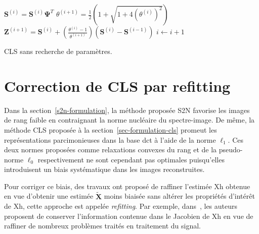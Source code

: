 \begin{normalalgorithme*}[t]
\begin{minipage}{\textwidth}
\begin{algorithm}[H]
{                    
                    $\mathbf{S}^{(i)} = \mathbf{S}^{(i)}\boldsymbol\Psi^T$  \hfill{}
                    $\theta^{(i+1)} = \frac{1}{2} \left(1+\sqrt{1+4(\theta^{(i)})^2}\right)$\;
                    $\mathbf{Z}^{(i+1)} = \mathbf{S}^{(i)} + \left( \frac{\theta^{(i)}-1}{\theta^{(i+1)}} \right) \left(\mathbf{S}^{(i)}-\mathbf{S}^{(i-1)} \right)$\;
                    $i \leftarrow i+1$
                }
                \medskip
            \end{algorithm}
        \end{minipage}
        \caption{CLS sans recherche de paramètres.\protect\label{algo-cls-sans-param}}
    \end{normalalgorithme*}




\section{Correction de CLS par refitting}

Dans la section~\ref{s2n-formulation}, la méthode proposée S2N favorise les images de rang faible en contraignant la norme nucléaire du spectre-image. De même, la méthode CLS proposée à la section~\ref{sec-formulation-cls} promeut les représentations parcimonieuses dans la base \gls{dct} à l'aide de la norme $\ell_{1}$. Ces deux normes proposées comme relaxations convexes du rang et de la pseudo-norme $\ell_0$ respectivement ne sont cependant pas optimales puisqu'elles introduisent un biais systématique dans les images reconstruites.

Pour corriger ce biais, des travaux ont proposé de raffiner l'estimée \gls{Xh} obtenue en vue d'obtenir une estimée $\tilde{\mathbf{X}}$ moins biaisée sans altérer les propriétés d'intérêt de \gls{Xh}, cette approche est appelée \emph{refitting}. %
%
Par exemple, dans~\cite{deledalle2017clear}, les auteurs proposent de conserver l'information contenue dans le Jacobien de \gls{Xh} en vue de raffiner de nombreux problèmes traités en traitement du signal.


